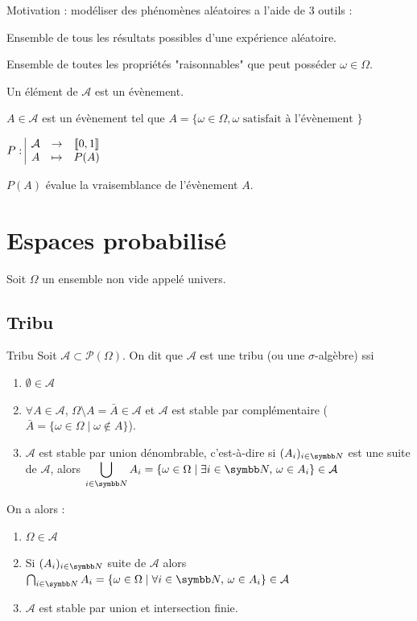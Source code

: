 Motivation : modéliser des phénomènes aléatoires a l'aide de 3 outils : 


Ensemble de tous les résultats possibles d'une expérience aléatoire.


Ensemble de toutes les propriétés "raisonnables" que peut posséder 
$\omega \in \Omega$. 

Un élément de $\mathcal A$ est un évènement. 

$A \in \mathcal A$ est un évènement tel que $A = \{ \omega \in \Omega, \omega \text{ satisfait à l'évènement } \}$



$P: \space \begin{array}{|ccc} \displaystyle \mathcal A & \to & \displaystyle [\![0, 1]\!] \\ \displaystyle A & \mapsto & \displaystyle P(A) \end{array}$

$P(A)$ évalue la vraisemblance de l'évènement $A$. 

\section{Espaces probabilisé}

Soit $\Omega$ un ensemble non vide appelé univers. 

\subsection{Tribu }

\begin{definition}{Tribu}{}
    Soit $\mathcal A \subset \mathscr P(\Omega)$. On dit que $\mathcal A$ est une tribu (ou une $\sigma$-algèbre)
    ssi 
    \begin{enumerate}
        \item $\emptyset \in \mathcal A$
        \item $\forall A \in \mathcal A$, $\Omega \setminus A = \bar A \in \mathcal A$ et $\mathcal A$ est stable 
        par complémentaire ($\bar A = \{ \omega \in \Omega \mid \omega \notin A \}$).
        \item $\mathcal A$ est stable par union dénombrable, c'est-à-dire si $(A_i)_{i \in \N}$ est une suite 
        de $\mathcal A$, alors $\displaystyle \bigcup_{i \in \N} A_i = \{\omega \in \Omega \mid \exists i \in \N, \, \omega \in A_i\} \in \mathcal A$ 
    \end{enumerate}
    On a alors : 
    \begin{enumerate}
        \item $\Omega \in \mathcal A$
        \item Si $(A_i)_{i \in \N} $ suite de $\mathcal A$ alors $\bigcap_{i \in \N} A_i = \{\omega \in \Omega \mid \forall i \in \N, \, \omega \in A_i\} \in \mathcal A$
        \item $\mathcal A$ est stable par union et intersection finie. 
    \end{enumerate}
\end{definition}


